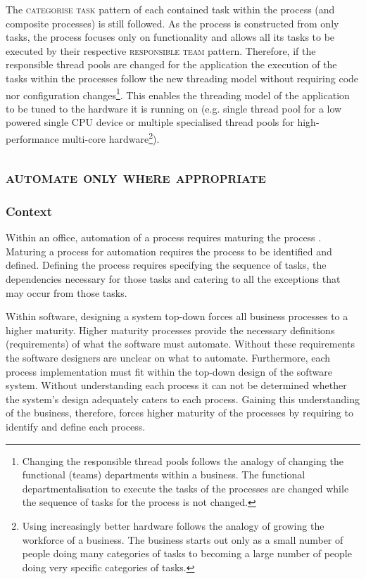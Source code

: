 \documentclass[prodmode]{style/acmlarge}
\begin{document}
The \textsc{categorise task} pattern of each contained task within the process
(and composite processes) is still followed.  As the process is constructed from
only tasks, the process focuses only on functionality and allows all its tasks
to be executed by their respective \textsc{responsible team} pattern.
Therefore, if the responsible thread pools are changed for the application the
execution of the tasks within the processes follow the new threading model
without requiring code nor configuration changes\footnote{Changing the
responsible thread pools follows the analogy of changing the functional (teams)
departments within a business.  The functional departmentalisation to execute
the tasks of the processes are changed while the sequence of tasks for the
process is not changed.}.  This enables the threading model of the application
to be tuned to the hardware it is running on (e.g. single thread pool for a low
powered single CPU device or multiple specialised thread pools for
high-performance multi-core hardware\footnote{Using increasingly better hardware
follows the analogy of growing the workforce of a business.  The business starts
out only as a small number of people doing many categories of tasks to becoming
a large number of people doing very specific categories of tasks.}).



\subsection{\textsc{\textbf{automate only where appropriate}}}

\subsubsection*{Context} Within an office, automation of a process requires
maturing the process \cite{process-maturity-global,bpm-tools}.  Maturing a
process for automation requires the process to be identified and defined. 
Defining the process requires specifying the sequence of tasks, the dependencies
necessary for those tasks and catering to all the exceptions that may occur from
those tasks.

Within software, designing a system top-down forces all business processes to a
higher maturity.  Higher maturity processes provide the necessary definitions
(requirements) of what the software must automate.  Without these requirements
the software designers are unclear on what to automate.  Furthermore, each
process implementation must fit within the top-down design of the software
system.  Without understanding each process it can not be determined whether
the system's design adequately caters to each process.  Gaining this
understanding of the business, therefore, forces higher maturity of the
processes by requiring to identify and define each process.
\end{document}

